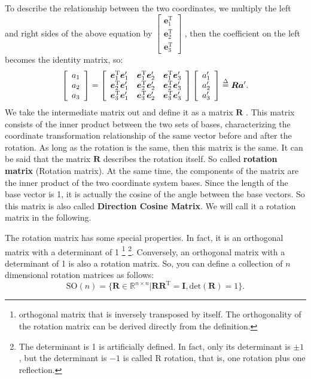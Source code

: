 To describe the relationship between the two coordinates, we multiply the left and right sides of the above equation by $ \left [ \begin {array}{l}
\bm{e}_1^\mathrm{T}\\
\bm{e}_2^\mathrm{T}\\
\bm{e}_3^\mathrm{T}
\end {array} \right ] $ , then the coefficient on the left becomes the identity matrix, so:
\begin{equation}
\left[ \begin{array}{l}
{a_1}\\
{a_2}\\
{a_3}
\end{array}\right]=\left[{\begin{array}{*{20}{c}}    
	{\bm{e}_1^\mathrm{T}\bm{e}_1'} & {\bm{e}_1^\mathrm{T}\bm{e}_2'} & {\bm{e}_1^\mathrm{T}\bm{e}_3'}\\
	{\bm{e}_2^\mathrm{T}\bm{e}_1'} & {\bm{e}_2^\mathrm{T}\bm{e}_2'} & {\bm{e}_2^\mathrm{T}\bm{e}_3'}\\
	{\bm{e}_3^\mathrm{T}\bm{e}_1'} & {\bm{e}_3^\mathrm{T}\bm{e}_2'} & {\bm{e}_3^\mathrm{T}\bm{e}_3'}
	\end{array}} \right]\left[ \begin{array}{l}
a_1'\\
a_2'\\
a_3'
\end{array} \right] \buildrel \Delta \over = \bm{R} \bm{a}'.
\end{equation}
We take the intermediate matrix out and define it as a matrix $ \bm{R} $ . This matrix consists of the inner product between the two sets of bases, characterizing the coordinate transformation relationship of the same vector before and after the rotation. As long as the rotation is the same, then this matrix is the same. It can be said that the matrix $ \bm{R} $ describes the rotation itself. So called \textbf{rotation matrix} (Rotation matrix). At the same time, the components of the matrix are the inner product of the two coordinate system bases. Since the length of the base vector is 1, it is actually the cosine of the angle between the base vectors. So this matrix is also called \textbf{Direction Cosine Matrix}. We will call it a rotation matrix in the following.

The rotation matrix has some special properties. In fact, it is an orthogonal matrix with a determinant of 1 \footnote{orthogonal matrix that is inversely transposed by itself. The orthogonality of the rotation matrix can be derived directly from the definition. } \footnote{The determinant is 1 is artificially defined. In fact, only its determinant is $ \pm  1 $ , but the determinant is $ - 1 $ is called R rotation, that is, one rotation plus one reflection. }. Conversely, an orthogonal matrix with a determinant of 1 is also a rotation matrix. So, you can define a collection of $ n $ dimensional rotation matrices as follows:
\begin{equation}
\mathrm{SO}(n) = \{ \bm{R} \in \mathbb{R}^{n \times n} | \bm{R R}^\mathrm{T} = \bm{I}, \mathrm{det} (\bm{R})=1 \}.
\end{equation}


